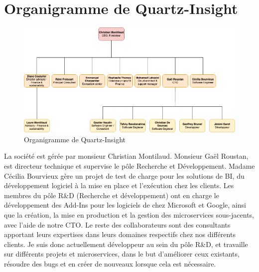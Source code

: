 \documentclass[a4paper, 11pt]{report}
\begin{document}
\section{Organigramme de Quartz-Insight}
\begin{figure}[h]
    \centering
    \includegraphics[scale=0.42,center]{schemas/organigramme-quartz-insight.png}
    \caption{Organigramme de Quartz-Insight}
\end{figure}
La société est gérée par monsieur Christian Montilaud.
Monsieur Gaël Roustan, est directeur technique et supervise le pôle Recherche et Développe\-ment.
Madame Cécilia Bourvieux gère un projet de test de charge pour les solutions de BI, du développement logiciel à la mise en place et l’exécution chez les clients.
Les membres du pôle R\&D (Recherche et développement) ont en charge le développement des Add-Ins pour les logiciels de chez Microsoft et Google, ainsi que la création, la mise en production et la gestion des microservices sous-jacents, avec l’aide de notre CTO.
Le reste des collaborateurs sont des consultants apportant leurs expertises dans leurs domaines respectifs chez nos différents clients.
\newline
\newline
Je suis donc actuellement développeur au sein du pôle R\&D, et travaille sur différents projets et microservices, dans le but d’améliorer ceux existants, résoudre des bugs et en créer de nouveaux lorsque cela est nécessaire.
\end{document}
